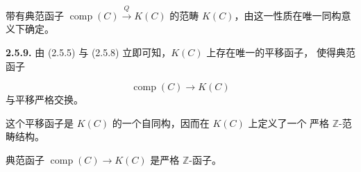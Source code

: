 带有典范函子 $\operatorname{comp}(C)\xrightarrow{Q}K(C)$ 的范畴
$K(C)$，由这一性质在唯一同构意义下确定。

\noindent\textbf{2.5.9.}\quad
由 (2.5.5) 与 (2.5.8) 立即可知，$K(C)$ 上存在唯一的平移函子，
使得典范函子

\begin{equation*}
  \operatorname{comp}(C)\longrightarrow K(C)
\end{equation*}
与平移严格交换。

这个平移函子是 $K(C)$ 的一个自同构，因而在 $K(C)$ 上定义了一个
严格 $\mathbb Z$-范畴结构。

典范函子 $\operatorname{comp}(C)\longrightarrow K(C)$ 是严格
$\mathbb Z$-函子。
